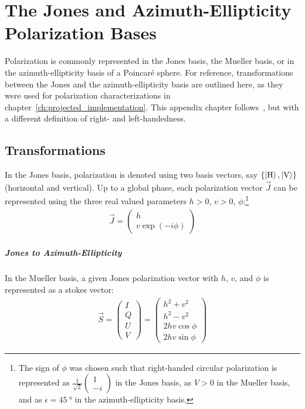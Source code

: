 \renewcommand{\imagepath}{../90-appendix/img}

\appendix
\chapter{The Jones and Azimuth-Ellipticity Polarization Bases}\label{ch:pypol_trafos}

Polarization is commonly represented in the Jones basis, the Mueller basis, or in the azimuth-ellipticity basis of a Poincaré sphere. For reference, transformations between the Jones and the azimuth-ellipticity basis are outlined here, as they were used for polarization characterizations in chapter~\ref{ch:projected_implementation}. This appendix chapter follows~\cite{trager_springer_2012}, but with a different definition of right- and left-handedness.

\section*{Transformations}
In the Jones basis, polarization is denoted using two basis vectors, say $\{\Ket{\text{H}}, \Ket{\text{V}}\}$ (horizontal and vertical). Up to a global phase, each polarization vector $\vec J$ can be represented using the three real valued parameters $h > 0$, $v > 0$, $\phi$:\footnote[1]{The sign of $\phi$ was chosen such that right-handed circular polarization is represented as $\frac{1}{\sqrt{2}}\begin{pmatrix}1 \\ -i \end{pmatrix}$ in the Jones basis, as $V > 0$ in the Mueller basis, and as $\epsilon  = \SI{45}{\degree}$ in the azimuth-ellipticity basis.}
\begin{align}
    \vec J = \begin{pmatrix}h \\ v \exp(-i \phi)\end{pmatrix}
\end{align}

\paragraph*{Jones to Azimuth-Ellipticity}
In the Mueller basis, a given Jones polarization vector with $h$, $v$, and $\phi$ is represented as a stokes vector:
\begin{align}
    \vec S = \begin{pmatrix}
        I \\ Q \\ U \\ V
    \end{pmatrix} = 
    \begin{pmatrix}
      h^2 + v^2\\
      h^2 - v^2\\
      2hv \cos \phi\\
      2hv \sin \phi  
    \end{pmatrix}
\end{align}

